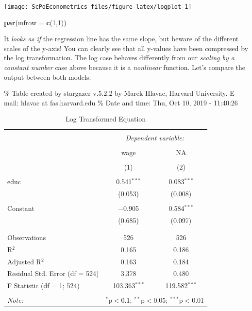 \documentclass[]{book}
\newenvironment{Shaded}{\begin{snugshade}}{\end{snugshade}}
\newcommand{\DataTypeTok}[1]{\textcolor[rgb]{0.13,0.29,0.53}{#1}}
\newcommand{\DecValTok}[1]{\textcolor[rgb]{0.00,0.00,0.81}{#1}}
\newcommand{\KeywordTok}[1]{\textcolor[rgb]{0.13,0.29,0.53}{\textbf{#1}}}
\newcommand{\NormalTok}[1]{#1}
\begin{document}
\begin{center}\texttt{[image: ScPoEconometrics\_files/figure-latex/logplot-1]} \end{center}

\begin{Shaded}
\begin{Highlighting}[]
\KeywordTok{par}\NormalTok{(}\DataTypeTok{mfrow =} \KeywordTok{c}\NormalTok{(}\DecValTok{1}\NormalTok{,}\DecValTok{1}\NormalTok{))}
\end{Highlighting}
\end{Shaded}

It \emph{looks as if} the regression line has the same slope, but beware of the different scales of the y-axis! You can clearly see that all y-values have been compressed by the log transformation. The log case behaves differently from our \emph{scaling by a constant number} case above because it is a \emph{nonlinear} function. Let's compare the output between both models:

\% Table created by stargazer v.5.2.2 by Marek Hlavac, Harvard University. E-mail: hlavac at fas.harvard.edu
\% Date and time: Thu, Oct 10, 2019 - 11:40:26

\begin{table}[!htbp] \centering 
  \caption{Log Transformed Equation} 
  \label{} 
\begin{tabular}{@{\extracolsep{5pt}}lcc} 
\\[-1.8ex]\hline 
\hline \\[-1.8ex] 
 & \multicolumn{2}{c}{\textit{Dependent variable:}} \\ 
\cline{2-3} 
\\[-1.8ex] & wage & NA \\ 
\\[-1.8ex] & (1) & (2)\\ 
\hline \\[-1.8ex] 
 educ & 0.541$^{***}$ & 0.083$^{***}$ \\ 
  & (0.053) & (0.008) \\ 
  & & \\ 
 Constant & $-$0.905 & 0.584$^{***}$ \\ 
  & (0.685) & (0.097) \\ 
  & & \\ 
\hline \\[-1.8ex] 
Observations & 526 & 526 \\ 
R$^{2}$ & 0.165 & 0.186 \\ 
Adjusted R$^{2}$ & 0.163 & 0.184 \\ 
Residual Std. Error (df = 524) & 3.378 & 0.480 \\ 
F Statistic (df = 1; 524) & 103.363$^{***}$ & 119.582$^{***}$ \\ 
\hline 
\hline \\[-1.8ex] 
\textit{Note:}  & \multicolumn{2}{r}{$^{*}$p$<$0.1; $^{**}$p$<$0.05; $^{***}$p$<$0.01} \\ 
\end{tabular} 
\end{table}
\end{document}

